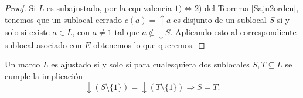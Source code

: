 \begin{proof}
    Si $L$ es subajustado, por la equivalencia $1)\Leftrightarrow 2)$ del Teorema \ref{Saju2orden}, tenemos que un sublocal cerrado $c(a)=\uparrow a$ es disjunto de un sublocal $S$ si y solo si existe $a\in L$, con $a\neq 1$ tal que $a\notin \downarrow S$. Aplicando esto al correspondiente sublocal asociado con $E$ obtenemos lo que queremos.
\end{proof}

\begin{prop}\label{Proposicion6.4}
    Un marco $L$ es ajustado si y solo si para cualesquiera dos sublocales $S, T\subseteq L$ se cumple la implicación
    \[
    \downarrow(S\setminus \{1\})=\downarrow(T\setminus \{1\})\Rightarrow S=T.
    \]
\end{prop}

